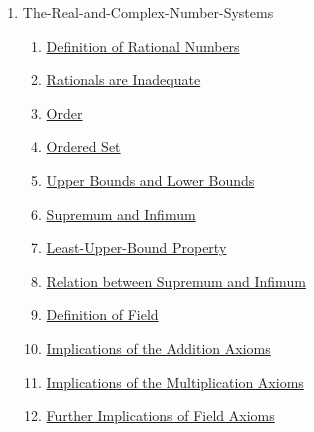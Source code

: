 \clearpage
\renewcommand{\notetitle}{Table of Contents}
\label{toc}
\begin{enumerate}

\item The-Real-and-Complex-Number-Systems
\begin{enumerate}
\item \hyperref[202501131947]{Definition of Rational Numbers}
\item \hyperref[202501132004]{Rationals are Inadequate}
\item \hyperref[202501141228]{Order}
\item \hyperref[202501141241]{Ordered Set}
\item \hyperref[202501141250]{Upper Bounds and Lower Bounds}
\item \hyperref[202501141546]{Supremum and Infimum}
\item \hyperref[202501141632]{Least-Upper-Bound Property}
\item \hyperref[202501141654]{Relation between Supremum and Infimum}
\item \hyperref[202501150657]{Definition of Field}
\item \hyperref[202501150717]{Implications of the Addition Axioms}
\item \hyperref[202501150809]{Implications of the Multiplication Axioms}
\item \hyperref[202501152115]{Further Implications of Field Axioms}
\end{enumerate}
\end{enumerate}

\newpage
